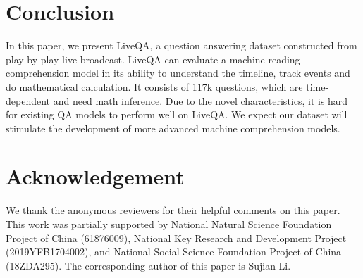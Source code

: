 \section{Conclusion}
In this paper, we present LiveQA, a question answering dataset constructed from play-by-play live broadcast. LiveQA can evaluate a machine reading comprehension model in its ability to understand the timeline, track events and do mathematical calculation. It  consists of 117k questions, which are time-dependent and need math inference. Due to the novel characteristics, it is hard for existing QA models to perform well on LiveQA. We expect our dataset will stimulate the development of more advanced machine comprehension models.

\section*{Acknowledgement}
We thank the anonymous reviewers for their helpful comments on this paper. This work was partially supported by  National Natural Science Foundation Project of China (61876009), National Key Research and Development Project
(2019YFB1704002), and National Social Science Foundation Project of China (18ZDA295). The corresponding author of this paper is Sujian Li.

